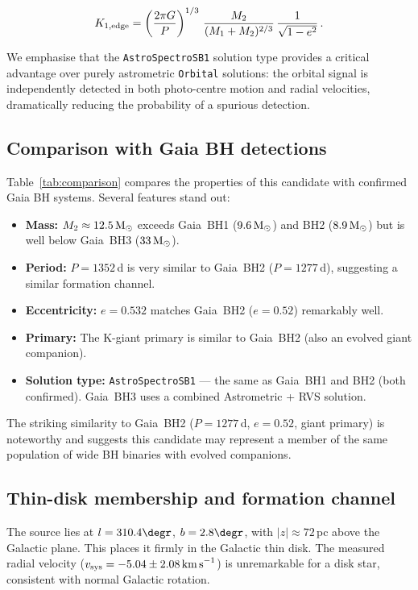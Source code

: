 \documentclass[usenatbib,fleqn]{mnras}
\newcommand{\Msun}{{\rm M}_\odot}
\newcommand{\kms}{{\rm km\,s}^{-1}}
\begin{document}
\begin{equation}
K_{1,{\rm edge}} = \left(\frac{2\pi G}{P}\right)^{1/3}\,
\frac{M_2}{(M_1 + M_2)^{2/3}}\,
\frac{1}{\sqrt{1-e^2}}\,.
\label{eq:K1}
\end{equation}

We emphasise that the \texttt{AstroSpectroSB1} solution type
provides a critical advantage over purely astrometric
\texttt{Orbital} solutions: the orbital signal is independently
detected in both photo-centre motion and radial velocities,
dramatically reducing the probability of a spurious detection.

\subsection{Comparison with Gaia BH detections}
\label{sec:discussion:comparison}

Table~\ref{tab:comparison} compares the properties of this
candidate with confirmed Gaia BH systems.  Several features stand
out:
\begin{itemize}
\item \textbf{Mass:} $M_2 \approx 12.5\,\Msun$ exceeds Gaia~BH1
  ($9.6\,\Msun$) and BH2 ($8.9\,\Msun$) but is well below
  Gaia~BH3 ($33\,\Msun$).
\item \textbf{Period:} $P = 1352$\,d is very similar to Gaia~BH2
  ($P = 1277$\,d), suggesting a similar formation channel.
\item \textbf{Eccentricity:} $e = 0.532$ matches Gaia~BH2
  ($e = 0.52$) remarkably well.
\item \textbf{Primary:} The K-giant primary is similar to
  Gaia~BH2 (also an evolved giant companion).
\item \textbf{Solution type:} \texttt{AstroSpectroSB1} --- the
  same as Gaia~BH1 and BH2 (both confirmed).  Gaia~BH3 uses
  a combined Astrometric + RVS solution.
\end{itemize}

The striking similarity to Gaia~BH2 ($P = 1277$\,d, $e = 0.52$,
giant primary) is noteworthy and suggests this candidate may
represent a member of the same population of wide BH binaries
with evolved companions.

\subsection{Thin-disk membership and formation channel}
\label{sec:discussion:disk}

The source lies at $l = 310.4\degr$, $b = 2.8\degr$, with
$|z| \approx 72$\,pc above the Galactic plane.  This places it
firmly in the Galactic thin disk.  The measured radial velocity
($v_{\rm sys} = -5.04 \pm 2.08\,\kms$) is unremarkable for a
disk star, consistent with normal Galactic rotation.
\end{document}
